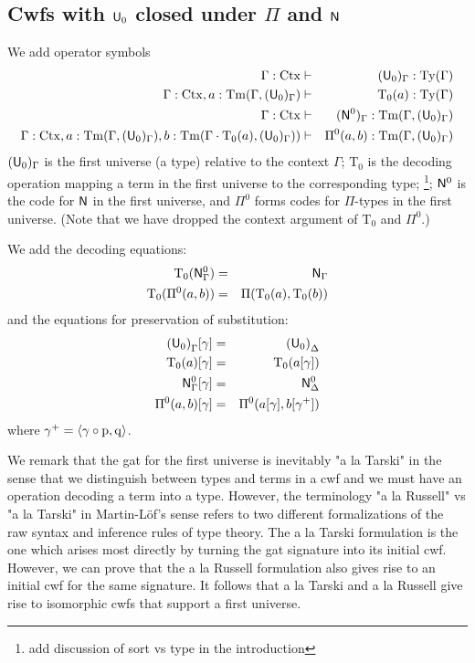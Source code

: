 \documentclass{lmcs}
\newcommand{\Ta}{\mathrm{T}}
\def\Ctx{\mathrm{Ctx}}
\begin{document}
\subsection{Cwfs with $\mathsf{U}_0$ closed under $\Pi$ and $\mathsf{N}$} 
We add operator symbols
\begin{eqnarray*}
\Gamma : \Ctx &\vdash& (\U_0)_\Gamma : \Ty(\Gamma)\\
\Gamma : \Ctx, a : \Tm(\Gamma,(\U_0)_\Gamma) &\vdash& {\Ta_0}(a) : \Ty(\Gamma)\\
\Gamma : \Ctx &\vdash& (\N^0)_\Gamma : \Tm(\Gamma,(\U_0)_\Gamma) \\
\Gamma : \Ctx, 
a : \Tm(\Gamma,(\U_0)_\Gamma), 
b :  \Tm(\Gamma \cdot \Ta_0(a), (\U_0)_\Gamma))
&\vdash&
 \Pi^0(a,b) : \Tm(\Gamma,(\U_0)_\Gamma)
\end{eqnarray*}
$(\mathsf{U}_0)_\Gamma$ is the first universe (a type) relative to the context $\Gamma$; $\Ta_0$ is the decoding operation mapping a term in the first universe to the corresponding type; \footnote{add discussion of sort vs type in the introduction}; $\mathsf{N}^0$ is the code for $\mathsf{N}$ in the first universe, and $\Pi^0$ forms codes for $\Pi$-types in the first universe. (Note that we have dropped the context argument of $\Ta_0$ and $\Pi^0$.)

We add the decoding equations:
\begin{eqnarray*}
\Ta_0(\N^0_\Gamma) &=& \N_\Gamma\\
\Ta_0(\Pi^0(a,b)) &=& \Pi(\Ta_0(a),\Ta_0(b))
\end{eqnarray*}
and the equations for preservation of substitution:
\begin{eqnarray*}
{(\U_0)}_\Gamma [ \gamma ] &=& {(\U_0)}_\Delta\\
\Ta_0(a) [ \gamma ] &=& \Ta_0(a[ \gamma ] )\\
\N^0_\Gamma [ \gamma ] &=&\N^0_\Delta\\
\Pi^0(a,b)[ \gamma ] &=& \Pi^0(a [ \gamma ], b[ \gamma^+ ])
\end{eqnarray*}
where $\gamma^+ = \langle \gamma \circ \mathrm{p}, \mathrm{q} \rangle$.

We remark that the gat for the first universe is inevitably "a la Tarski" in the sense that we distinguish between types and terms in a cwf and we must have an operation decoding a term into a type. However, the terminology "a la Russell" vs "a la Tarski" in Martin-Löf's sense refers to two different formalizations of the raw syntax and inference rules of type theory. The a la Tarski formulation is the one which arises most directly by turning the gat signature into its initial cwf. However, we can prove that the a la Russell formulation also gives rise to an initial cwf for the same signature. It follows that a la Tarski and a la Russell give rise to isomorphic cwfs that support a first universe.
\end{document}
